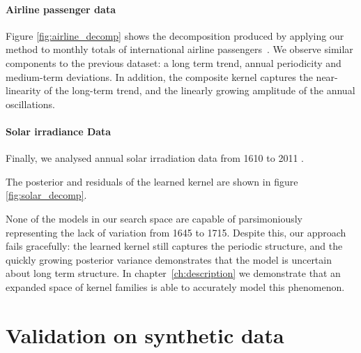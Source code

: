\paragraph{Airline passenger data}

Figure \ref{fig:airline_decomp} shows the decomposition produced by applying our method to monthly totals of international airline passengers~\citep[e.g.][]{Box1976-qk}.
We observe similar components to the previous dataset: a long term trend, annual periodicity and medium-term deviations.
In addition, the composite kernel captures the near-linearity of the long-term trend, and the linearly growing amplitude of the annual oscillations.

\paragraph{Solar irradiance Data} 
Finally, we analysed annual solar irradiation data from 1610 to 2011 \citep{lean1995reconstruction}.
%

%
The posterior and residuals of the learned kernel are shown in figure \ref{fig:solar_decomp}.
%

%
None of the models in our search space are capable of parsimoniously representing the lack of variation from 1645 to 1715.
Despite this, our approach fails gracefully: the learned kernel still captures the periodic structure, and the quickly growing posterior variance demonstrates that the model is uncertain about long term structure.
In chapter~\ref{ch:description} we demonstrate that an expanded space of kernel families is able to accurately model this phenomenon.

\section{Validation on synthetic data}
\label{sec:synthetic}

